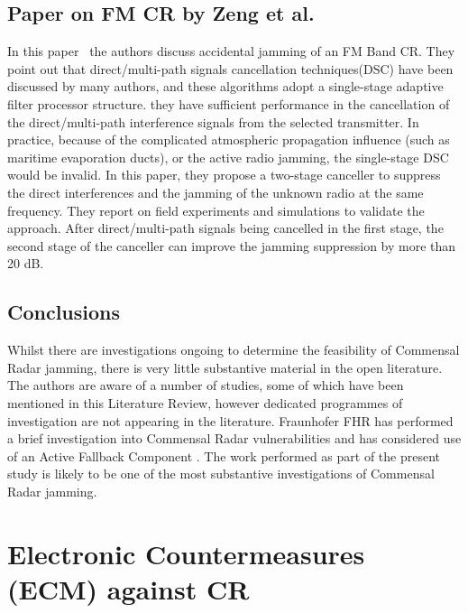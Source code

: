 \documentclass[english, 12pt]{report}
\begin{document}
\section{Paper on FM CR by Zeng et al.}

In this paper~\cite{zheng:08} the authors discuss accidental jamming of an FM Band CR.  They point out that direct/multi-path signals cancellation techniques(DSC) have been discussed by many authors, and these algorithms adopt a single-stage adaptive filter processor structure. they have sufficient performance in the cancellation of the direct/multi-path interference signals from the selected transmitter. In practice, because of the complicated atmospheric propagation influence (such as maritime evaporation ducts), or the active radio jamming, the single-stage DSC would be invalid. In this paper, they propose a two-stage canceller to suppress the direct interferences and the jamming of the unknown radio at the same frequency. They report on field experiments and simulations to validate the approach. After direct/multi-path signals being cancelled in the first stage, the second stage of the canceller can improve the jamming suppression by more than 20 dB.



\section{Conclusions}

Whilst there are investigations ongoing to determine the feasibility of Commensal Radar jamming, there is very little substantive material in the open literature. The authors are aware of a number of studies, some of which have been mentioned in this Literature Review, however dedicated programmes of investigation are not appearing in the literature. Fraunhofer FHR has performed a brief investigation into Commensal Radar vulnerabilities and has considered use of an Active Fallback Component \cite{doh}. The work performed as part of the present study is likely to be one of the most substantive investigations of Commensal Radar jamming.     

\chapter{Electronic Countermeasures (ECM) against CR}
\end{document}

